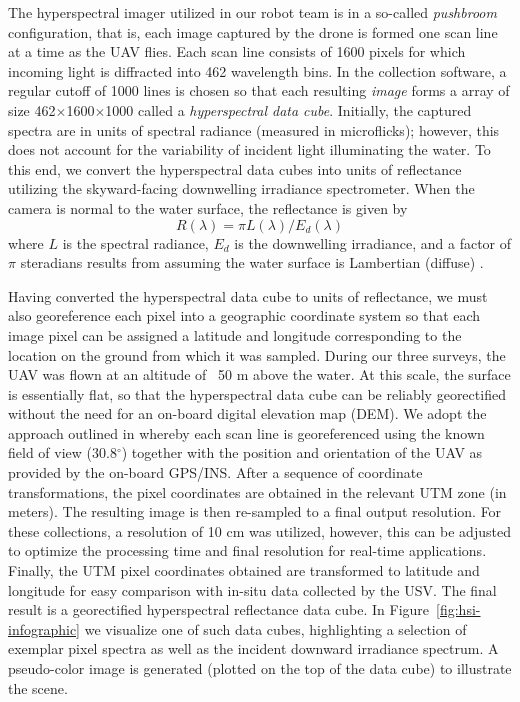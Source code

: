 \documentclass[remotesensing,article,submit,pdftex,moreauthors]{Definitions/mdpi}
\begin{document}
The hyperspectral imager utilized in our robot team is in a so-called \textit{pushbroom} configuration, that is, each image captured by the drone is formed one scan line at a time as the UAV flies. Each scan line consists of 1600 pixels for which incoming light is diffracted into 462 wavelength bins. In the collection software, a regular cutoff of 1000 lines is chosen so that each resulting \textit{image} forms a array of size 462$\times$1600$\times$1000 called a \textit{hyperspectral data cube}. Initially, the captured spectra are in units of spectral radiance (measured in microflicks); however, this does not account for the variability of incident light illuminating the water. To this end, we convert the hyperspectral data cubes into units of reflectance utilizing the skyward-facing downwelling irradiance spectrometer. When the camera is normal to the water surface, the reflectance is given by
\begin{equation}
    R(\lambda) = \pi L(\lambda)/E_d(\lambda)
\end{equation}
where $L$ is the spectral radiance, $E_d$ is the downwelling irradiance, and a factor of $\pi$ steradians results from assuming the water surface is Lambertian (diffuse) \cite{reflectance-conversion}. 

Having converted the hyperspectral data cube to units of reflectance, we must also georeference each pixel into a geographic coordinate system so that each image pixel can be assigned a latitude and longitude corresponding to the location on the ground from which it was sampled. During our three surveys, the UAV was flown at an altitude of ~50 m above the water. At this scale, the surface is essentially flat, so that the hyperspectral data cube can be reliably georectified without the need for an on-board digital elevation map (DEM). We adopt the approach outlined in \cite{GeorectificationMuller, GeorectificationBaumker, GeorectificationMostafa} whereby each scan line is georeferenced using the known field of view (30.8$^\circ$) together with the position and orientation of the UAV as provided by the on-board GPS/INS. After a sequence of coordinate transformations, the pixel coordinates are obtained in the relevant UTM zone (in meters). The resulting image is then re-sampled to a final output resolution. For these collections, a resolution of 10 cm was utilized, however, this can be adjusted to optimize the processing time and final resolution for real-time applications. Finally, the UTM pixel coordinates obtained are transformed to latitude and longitude for easy comparison with in-situ data collected by the USV. The final result is a georectified hyperspectral reflectance data cube. In Figure~\ref{fig:hsi-infographic} we visualize one of such data cubes, highlighting a selection of exemplar pixel spectra as well as the incident downward irradiance spectrum. A pseudo-color image is generated (plotted on the top of the data cube) to illustrate the scene.
\end{document}
